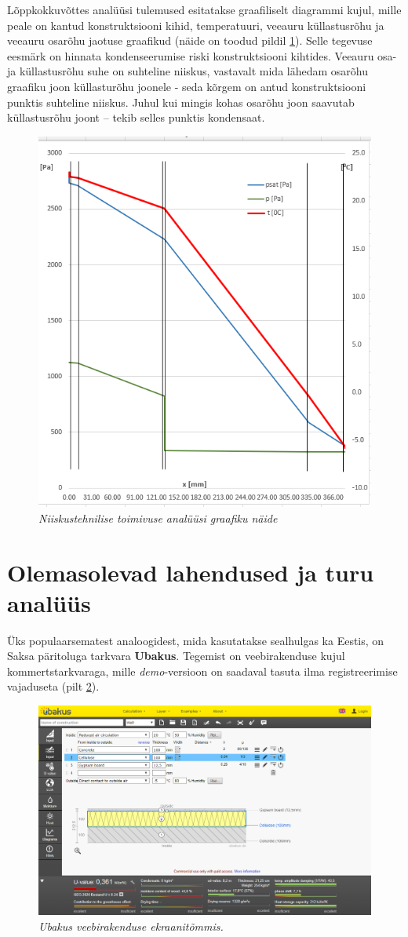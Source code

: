 Lõppkokkuvõttes analüüsi tulemused esitatakse graafiliselt diagrammi kujul, mille peale on kantud konstruktsiooni kihid, temperatuuri, veeauru küllastusrõhu
ja veeauru osarõhu jaotuse graafikud (näide on toodud pildil \ref{fig:excel_graph_sample}). Selle tegevuse eesmärk on hinnata kondenseerumise riski konstruktsiooni
kihtides. Veeauru osa- ja küllastusrõhu suhe on suhteline niiskus, vastavalt mida lähedam osarõhu graafiku joon küllasturõhu joonele - seda kõrgem on antud konstruktsiooni 
punktis suhteline niiskus. Juhul kui mingis kohas osarõhu joon saavutab küllastusrõhu joont -- tekib selles punktis kondensaat. 

\begin{figure}[ht]
    \centering
    \includegraphics[width=.6\textwidth]{figures/01_analogues/05_excel_grafic_sample.png}
    \caption{\textit{Niiskustehnilise toimivuse analüüsi graafiku näide}}
    \label{fig:excel_graph_sample}
\end{figure}


\section{Olemasolevad lahendused ja turu analüüs}
Üks populaarsematest analoogidest, mida kasutatakse sealhulgas ka Eestis, on Saksa päritoluga tarkvara \textbf{Ubakus}. Tegemist on veebirakenduse kujul kommertstarkvaraga, mille
\textit{demo}-versioon on saadaval tasuta ilma registreerimise vajaduseta (pilt \ref{fig:ubakus_sample}). 
\begin{figure}[ht]
    \centering
    \includegraphics[width=.8\textwidth]{figures/01_analogues/01_ubakus.png}
    \caption{\textit{Ubakus veebirakenduse ekraanitõmmis.}}
    \label{fig:ubakus_sample}
\end{figure}

